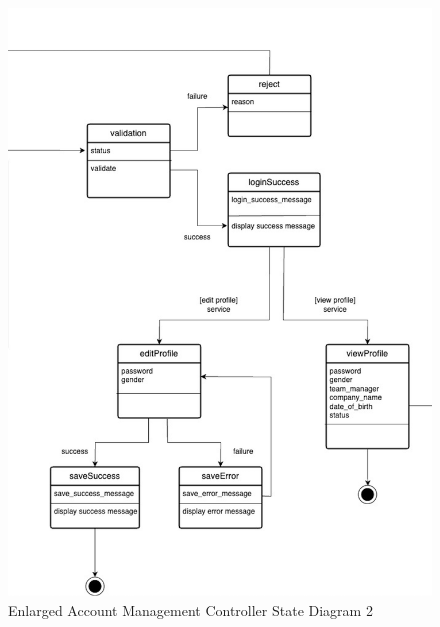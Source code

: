 \documentclass[]{article}
\begin{document}
\begin{figure}[H]
	\centering
	\includegraphics[scale=0.75]{account-2.png}
	\caption{Enlarged Account Management Controller State Diagram 2}
	\label{fig:authentication-controller}
\end{figure}
\end{document}
